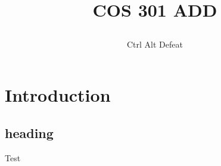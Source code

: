 \documentclass[12pt]{article}
\title{

\\
{COS 301 ADD}
}
\author{Ctrl Alt Defeat}
\begin{document}


\tableofcontents

\newpage



\section{Introduction}
\subsection{heading}
Test
\end{document}
